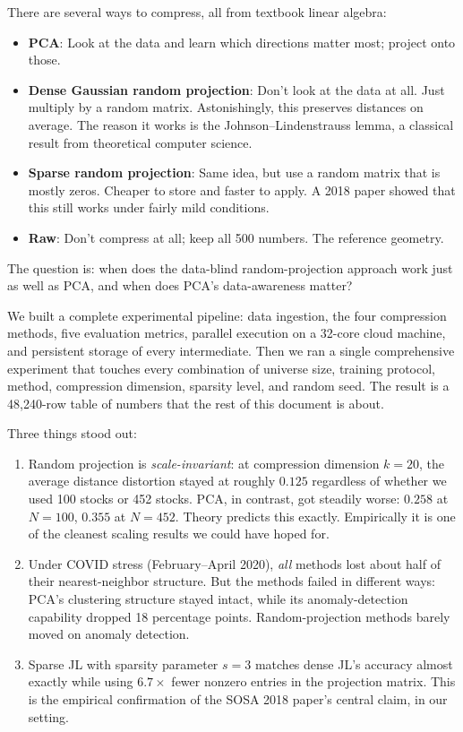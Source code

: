 \documentclass[11pt]{article}
\begin{document}
There are several ways to compress, all from textbook linear algebra:

\begin{itemize}
    \item \textbf{PCA}: Look at the data and learn which directions matter most; project onto those.
    \item \textbf{Dense Gaussian random projection}: Don't look at the data at all. Just multiply by a random matrix. Astonishingly, this preserves distances on average. The reason it works is the Johnson--Lindenstrauss lemma, a classical result from theoretical computer science.
    \item \textbf{Sparse random projection}: Same idea, but use a random matrix that is mostly zeros. Cheaper to store and faster to apply. A 2018 paper showed that this still works under fairly mild conditions.
    \item \textbf{Raw}: Don't compress at all; keep all 500 numbers. The reference geometry.
\end{itemize}

The question is: when does the data-blind random-projection approach work just as well as PCA, and when does PCA's data-awareness matter?

We built a complete experimental pipeline: data ingestion, the four compression methods, five evaluation metrics, parallel execution on a 32-core cloud machine, and persistent storage of every intermediate. Then we ran a single comprehensive experiment that touches every combination of universe size, training protocol, method, compression dimension, sparsity level, and random seed. The result is a 48{,}240-row table of numbers that the rest of this document is about.

Three things stood out:

\begin{enumerate}
    \item Random projection is \emph{scale-invariant}: at compression dimension $k = 20$, the average distance distortion stayed at roughly $0.125$ regardless of whether we used 100 stocks or 452 stocks. PCA, in contrast, got steadily worse: $0.258$ at $N=100$, $0.355$ at $N=452$. Theory predicts this exactly. Empirically it is one of the cleanest scaling results we could have hoped for.
    \item Under COVID stress (February--April 2020), \emph{all} methods lost about half of their nearest-neighbor structure. But the methods failed in different ways: PCA's clustering structure stayed intact, while its anomaly-detection capability dropped 18 percentage points. Random-projection methods barely moved on anomaly detection.
    \item Sparse JL with sparsity parameter $s = 3$ matches dense JL's accuracy almost exactly while using $6.7\times$ fewer nonzero entries in the projection matrix. This is the empirical confirmation of the SOSA 2018 paper's central claim, in our setting.
\end{enumerate}
\end{document}

